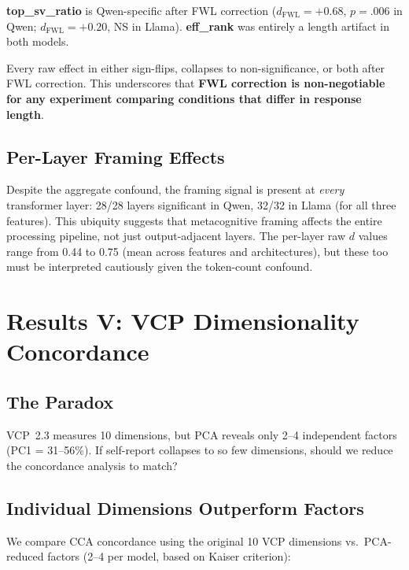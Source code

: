 \documentclass[11pt,a4paper]{article}
\begin{document}
\textbf{top\_sv\_ratio} is Qwen-specific after FWL correction ($d_{\text{FWL}} = +0.68$, $p = .006$ in Qwen; $d_{\text{FWL}} = +0.20$, NS in Llama). \textbf{eff\_rank} was entirely a length artifact in both models.

Every raw effect in  either sign-flips, collapses to non-significance, or both after FWL correction. This underscores that \textbf{FWL correction is non-negotiable for any experiment comparing conditions that differ in response length}.

\subsection{Per-Layer Framing Effects}

Despite the aggregate confound, the framing signal is present at \emph{every} transformer layer: 28/28 layers significant in Qwen, 32/32 in Llama (for all three features). This ubiquity suggests that metacognitive framing affects the entire processing pipeline, not just output-adjacent layers. The per-layer raw $d$ values range from 0.44 to 0.75 (mean across features and architectures), but these too must be interpreted cautiously given the token-count confound.

\section{Results V: VCP Dimensionality Concordance}

\subsection{The Paradox}

VCP~2.3 measures 10 dimensions, but PCA reveals only 2--4 independent factors (PC1 = 31--56\%). If self-report collapses to so few dimensions, should we reduce the concordance analysis to match?

\subsection{Individual Dimensions Outperform Factors}

We compare CCA concordance using the original 10 VCP dimensions vs.\ PCA-reduced factors (2--4 per model, based on Kaiser criterion):
\end{document}
